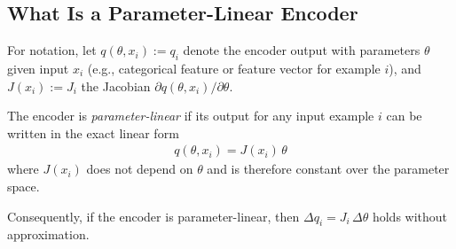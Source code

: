 \subsection{What Is a Parameter-Linear Encoder}

For notation, let
\( q(\theta, x_i) := q_i \) 
denote the encoder output with parameters $\theta$ given input $x_i$ (e.g., categorical feature or feature vector for example $i$), and
\( J(x_i) := J_i \) 
the Jacobian $\partial q(\theta, x_i)/\partial\theta$.

The encoder is \emph{parameter-linear} if its output for any input example $i$ can be written in the exact linear form
\begin{align}
q(\theta, x_i) = J(x_i)\,\theta
\end{align}
where $J(x_i)$ does not depend on $\theta$ and is therefore constant over the parameter space.

Consequently, if the encoder is parameter-linear, then $\Delta q_i = J_i\,\Delta\theta$ holds without approximation.